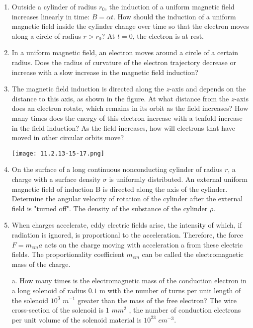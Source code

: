 \documentclass{article}
\begin{document}
\begin{enumerate}[label=11.2.\arabic*]
\item Outside a cylinder of radius $r_0$, the induction of a uniform magnetic field increases linearly in time: $B = \alpha t$. How should the induction of a uniform magnetic field inside the cylinder change over time so that the electron moves along a circle of radius $r > r_0$? At $t = 0$, the electron is at rest.

\item In a uniform magnetic field, an electron moves around a circle of a certain radius. Does the radius of curvature of the electron trajectory decrease or increase with a slow increase in the magnetic field induction?

\item The magnetic field induction is directed along the $z$-axis and depends on the distance to this axis, as shown in the figure. At what distance from the $z$-axis does an electron rotate, which remains in its orbit as the field increases? How many times does the energy of this electron increase with a tenfold increase in the field induction? As the field increases, how will electrons that have moved in other circular orbits move?

\begin{center}
    \texttt{[image: 11.2.13-15-17.png]}
\end{center}

\item On the surface of a long continuous nonconducting cylinder of radius $r$, a charge with a surface density $\sigma$ is uniformly distributed. An external uniform magnetic field of induction B is directed along the axis of the cylinder. Determine the angular velocity of rotation of the cylinder after the external field is "turned off". The density of the substance of the cylinder $\rho$.

\item When charges accelerate, eddy electric fields arise, the intensity of which, if radiation is ignored, is proportional to the acceleration. Therefore, the force $F = m_{em}a$ acts on the charge moving with acceleration a from these electric fields. The proportionality coefficient $m_{em}$ can be called the electromagnetic mass of the charge. 

a. How many times is the electromagnetic mass of the conduction electron in a long solenoid of radius $0.1$ m with the number of turns per unit length of the solenoid $10^3$ $m^{-1}$ greater than the mass of the free electron? The wire cross-section of the solenoid is $1$ $mm^2$ , the number of conduction electrons per unit volume of the solenoid material is $10^{23}$ $cm^{-3}$.


\end{enumerate}
\end{document}
